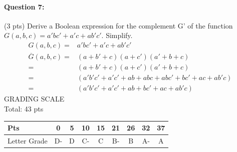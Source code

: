 \documentclass[12pt,letterpaper,titlepage]{report}
\begin{document}
\paragraph{Question 7: } (3 pts) Derive a Boolean expression for the complement G’ of the function $G(a,b,c) = a′bc′ + a′c + ab′c′$. Simplify.  
\begin{align*}
G(a,b,c) =& a′bc′ + a′c + ab′c′\\
\overline{G}(a,b,c) =& (a+b'+c)(a+c')(a'+b+c)
				    \\
				  	=& (a+b'+c)(a+c')(a'+b+c)
				    \\
				  	=& (
				  		a'b'c'+a'c'
				  		+ab+abc+abc'+bc'
				  		+ac+ab'c			  		
				  		)
				    \\
				  	=& (
				  		a'b'c'+a'c'
				  		+ab+bc'+ac+ab'c
				  		)
\end{align*}
\bigskip\noindent
GRADING SCALE\\\medskip
Total: 43 pts\bigskip
\begin{flushleft}
\def\arraystretch{1.5}
\begin{tabular}{ | l | c | c | c | c | c | c | c | c | } \hline
Pts          & 0  & 5  & 10 & 15 & 21 & 26 & 32 & 37     \\\hline
Letter Grade & D- & D  & C- & C  & B- & B  & A- & A      \\\hline
\end{tabular}
\end{flushleft}
\end{document}
